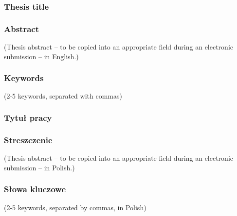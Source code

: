 \documentclass[a4paper,twoside,12pt]{book}
\begin{document}

\cleardoublepage

\rmfamily\normalfont
\pagestyle{empty}



\subsubsection*{Thesis title} \Title

\subsubsection*{Abstract}  
(Thesis abstract – to be copied into an appropriate field during an electronic submission – in English.)

\subsubsection*{Keywords} 
(2-5 keywords, separated with commas)

\subsubsection*{Tytuł pracy} 
\begin{otherlanguage}{polish}
\TitleAlt
\end{otherlanguage}

\subsubsection*{Streszczenie} 
\begin{otherlanguage}{polish}
(Thesis abstract – to be copied into an appropriate field during an electronic submission – in Polish.)
\end{otherlanguage}
\subsubsection*{Słowa kluczowe}  
\begin{otherlanguage}{polish}
(2-5 keywords, separated by commas, in Polish)
\end{otherlanguage}



\tableofcontents
\end{document}
